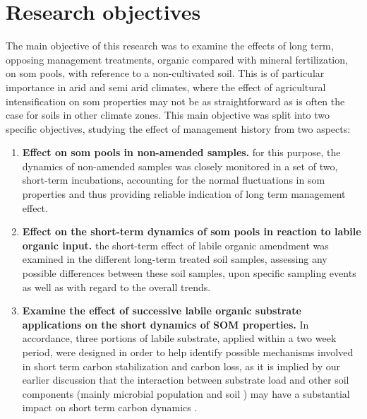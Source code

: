 \documentclass[12pt]{report}
\begin{document}
		\section{Research objectives}
		
		The main objective of this research was to examine the effects of long term, opposing management treatments, organic compared with mineral fertilization, on \gls{som} pools,  with reference to a non-cultivated soil. This is of particular importance in arid and semi arid climates, where the effect of agricultural intensification on \gls{som} properties may not be as straightforward as is often the case for soils in other climate zones.
		This main objective was split into two specific objectives, studying the effect of management history from two aspects:
		\begin{enumerate}
			\item \textbf{Effect on \gls{som} pools in non-amended samples.} for this purpose, the dynamics of non-amended samples was closely monitored in a set of two, short-term incubations, accounting for the normal fluctuations in \gls{som} properties and thus providing reliable indication of long term management effect.
			\item \textbf{Effect on the short-term dynamics of \gls{som} pools in reaction to labile organic input.} the short-term effect of labile organic amendment was examined in the different long-term treated soil samples, assessing any possible differences between these soil samples, upon specific sampling events as well as with regard to the overall trends.
			
			
			\item \textbf{Examine the effect of successive labile organic substrate applications on the short dynamics of SOM properties.} In accordance, three portions of labile substrate, applied within a two week period, were designed in  order to help identify possible mechanisms involved in short term carbon stabilization and carbon loss, as it is implied by our earlier discussion that the interaction between substrate load and other soil components (mainly microbial population and soil
			) may have a substantial impact on short term carbon dynamics .
		\end{enumerate}
\end{document}
